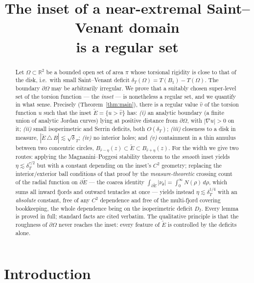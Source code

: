 \documentclass[11pt]{article}
\title{The inset of a near-extremal Saint--Venant domain\\
       is a regular set}
\author{}
\date{}
\theoremstyle{definition}
\newcommand{\R}{\mathbb{R}}
\newcommand{\Om}{\Omega}
\newcommand{\dT}{\delta_T}
\newcommand{\Etil}{\widetilde E}
\begin{document}
\maketitle

\begin{abstract}
Let $\Om\subset\R^2$ be a bounded open set of area $\pi$ whose torsional
rigidity is close to that of the disk, i.e.\ with small Saint--Venant
deficit $\dT(\Om)=T(B_1)-T(\Om)$. The boundary $\partial\Om$ may be
arbitrarily irregular. We prove that a suitably chosen super-level set of
the torsion function --- the \emph{inset} --- is nonetheless a regular set,
and we quantify in what sense. Precisely (Theorem~\ref{thm:main}), there is
a regular value $\hat v$ of the torsion function $u$ such that the inset
$\Etil=\{u>\hat v\}$ has: \emph{(i)} an analytic boundary (a finite union of
analytic Jordan curves) lying at positive distance from $\partial\Om$, with
$|\nabla u|>0$ on it; \emph{(ii)} small isoperimetric and Serrin deficits,
both $O(\dT)$; \emph{(iii)} closeness to a disk in measure,
$|\Etil\,\triangle\,B|\lesssim\sqrt\dT$; \emph{(iv)} no interior holes; and
\emph{(v)} containment in a thin annulus between two concentric circles,
$B_{\hat r-\eta}(z)\subset\Etil\subset B_{\hat r+\eta}(z)$. For the width we
give two routes: applying the Magnanini--Poggesi stability theorem to the
\emph{smooth} inset yields $\eta\lesssim\dT^{\tau/2}$ but with a constant
depending on the inset's $C^2$ geometry; replacing the interior/exterior
ball conditions of that proof by the \emph{measure-theoretic} crossing count
of the radial function on $\partial\Etil$ --- the coarea identity
$\int_{\partial\Etil}|\nu_\theta|=\int_0^\infty N(\rho)\,d\rho$, which sums
all inward fjords and outward tentacles at once --- yields instead
$\eta\lesssim\dT^{1/4}$ with an \emph{absolute} constant, free of any $C^2$
dependence and free of the multi-fjord covering bookkeeping, the whole
dependence being on the isoperimetric deficit $D_I$. Every lemma is proved
in full; standard facts are cited verbatim. The qualitative principle is
that the roughness of $\partial\Om$ never reaches the inset: every feature
of $\Etil$ is controlled by the deficits alone.
\end{abstract}

\tableofcontents

\section{Introduction}\label{sec:intro}
\end{document}
